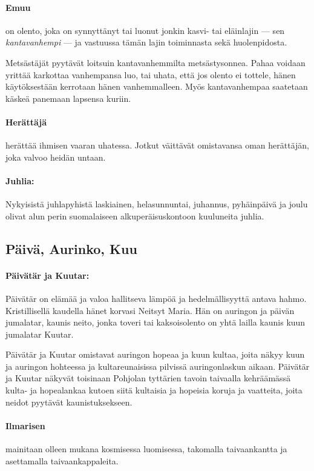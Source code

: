   \paragraph{Emuu} on olento, joka on synnyttänyt tai luonut jonkin kasvi- tai eläinlajin ---
    sen \emph{kantavanhempi} --- ja vastuussa tämän lajin toiminnasta sekä huolenpidosta.
    \par
    Metsästäjät pyytävät loitsuin kantavanhemmilta metsästysonnea. Pahaa voidaan yrittää karkottaa
    vanhempansa luo, tai uhata, että jos olento ei tottele, hänen käytöksestään kerrotaan hänen
    vanhemmalleen. Myös kantavanhempaa saatetaan käskeä panemaan lapsensa kuriin.
  \paragraph{Herättäjä} herättää ihmisen vaaran uhatessa. Jotkut väittävät omistavansa oman
    herättäjän, joka valvoo heidän untaan.
  \paragraph{Juhlia:} Nykyisistä juhlapyhistä laskiainen, helasunnuntai, juhannus, pyhäinpäivä ja 
    joulu olivat alun perin suomalaiseen alkuperäisuskontoon kuuluneita juhlia.


\subsection{Päivä, Aurinko, Kuu}

  \paragraph{Päivätär ja Kuutar:} Päivätär on elämää ja valoa hallitseva lämpöä ja hedelmällisyyttä
    antava hahmo. Kristillisellä kaudella hänet korvasi Neitsyt Maria. Hän on auringon ja päivän
    jumalatar, kaunis neito, jonka toveri tai kaksois\-olento on yhtä lailla kaunis kuun jumalatar
    Kuutar.
    \par
    Päivätär ja Kuutar omistavat auringon hopeaa ja kuun kultaa, joita näkyy kuun ja auringon
    hohteessa ja kultareunaisissa pilvissä auringonlaskun aikaan. Päivätär ja Kuutar näkyvät
    toisinaan Pohjolan tyttärien tavoin taivaalla kehräämässä kulta- ja hopealankaa kutoen
    siitä kultaisia ja hopeisia koruja ja vaatteita, joita neidot pyytävät kaunistuksekseen.

  \paragraph{Ilmarisen} mainitaan olleen mukana kosmisessa luomisessa, takomalla taivaankantta
    ja asettamalla taivaankappaleita.

